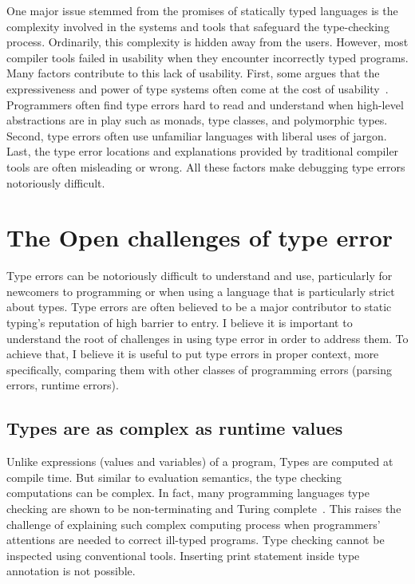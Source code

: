 One major issue stemmed from the promises of statically typed languages is the complexity involved in the systems and tools that safeguard the type-checking process. Ordinarily, this complexity is hidden away from the users. However, most compiler tools failed in usability when they encounter incorrectly typed programs. Many factors contribute to this lack of usability. First, some argues that the expressiveness and power of type systems often come at the cost of usability~\cite{Hage2020-hg}.  Programmers often find type errors hard to read and understand when high-level abstractions are in play such as monads, type classes, and polymorphic types. Second, type errors often use unfamiliar languages with liberal uses of jargon. Last, the type error locations and explanations provided by traditional compiler tools are often misleading or wrong. All these factors make debugging type errors notoriously difficult.

\section{The Open challenges of type error}

Type errors can be notoriously difficult to understand and use, particularly for newcomers to programming or when using a language that is particularly strict about types. Type errors are often believed to be a major contributor to static typing's reputation of high barrier to entry. I believe it is important to understand the root of challenges in using type error in order to address them. To achieve that, I believe it is useful to put type errors in proper context, more specifically, comparing them with other classes of programming errors (parsing errors, runtime errors). 

\subsection{Types are as complex as runtime values}

Unlike expressions (values and variables) of a program, Types are computed at compile time. But similar to evaluation semantics, the type checking computations can be complex. In fact, many programming languages type checking are shown to be non-terminating and Turing complete~\cite{Wells1999-ob}. This raises the challenge of explaining such complex computing process when programmers' attentions are needed to correct ill-typed programs. Type checking cannot be inspected using conventional tools. Inserting print statement inside type annotation is not possible. 


